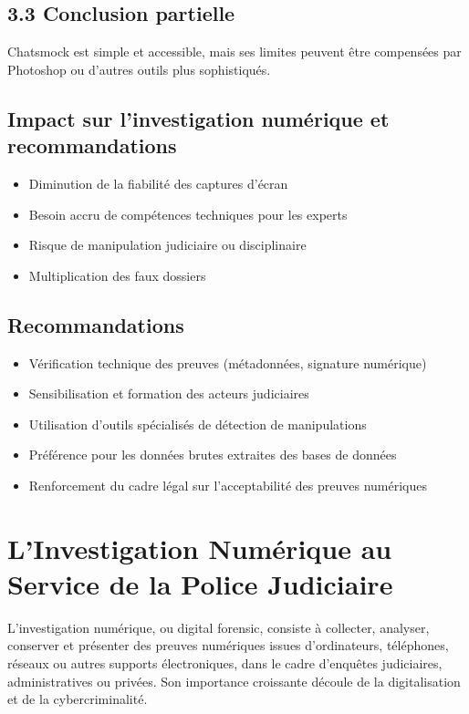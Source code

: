 \documentclass[12pt]{article}
\begin{document}
\begin{center}
\subsection*{3.3 Conclusion partielle}
Chatsmock est simple et accessible, mais ses limites peuvent être compensées par Photoshop ou d’autres outils plus sophistiqués.

\subsection{ Impact sur l'investigation numérique et recommandations}

\begin{itemize}[leftmargin=*, label=\textbullet]
    \item Diminution de la fiabilité des captures d'écran
    \item Besoin accru de compétences techniques pour les experts
    \item Risque de manipulation judiciaire ou disciplinaire
    \item Multiplication des faux dossiers
\end{itemize}

\subsection*{Recommandations}
\begin{itemize}[leftmargin=*, label=\textbullet]
    \item Vérification technique des preuves (métadonnées, signature numérique)
    \item Sensibilisation et formation des acteurs judiciaires
    \item Utilisation d’outils spécialisés de détection de manipulations
    \item Préférence pour les données brutes extraites des bases de données
    \item Renforcement du cadre légal sur l’acceptabilité des preuves numériques
\end{itemize}

\section{L'Investigation Numérique au Service de la Police Judiciaire}

L’investigation numérique, ou digital forensic, consiste à collecter, analyser, conserver et présenter des preuves numériques issues d’ordinateurs, téléphones, réseaux ou autres supports électroniques, dans le cadre d’enquêtes judiciaires, administratives ou privées. Son importance croissante découle de la digitalisation et de la cybercriminalité.


\end{center}
\end{document}
